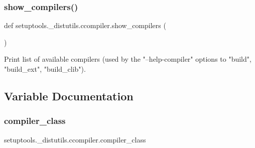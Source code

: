 \subsubsection{\texorpdfstring{show\+\_\+compilers()}{show\_compilers()}}
{\footnotesize\ttfamily def setuptools.\+\_\+distutils.\+ccompiler.\+show\+\_\+compilers (\begin{DoxyParamCaption}{ }\end{DoxyParamCaption})}

\begin{DoxyVerb}Print list of available compilers (used by the "--help-compiler"
options to "build", "build_ext", "build_clib").
\end{DoxyVerb}
 

\subsection{Variable Documentation}
\mbox{\label{namespacesetuptools_1_1__distutils_1_1ccompiler_ad41ffa303595565cef666a42c0e954da}} 
\subsubsection{\texorpdfstring{compiler\+\_\+class}{compiler\_class}}
{\footnotesize\ttfamily setuptools.\+\_\+distutils.\+ccompiler.\+compiler\+\_\+class}

